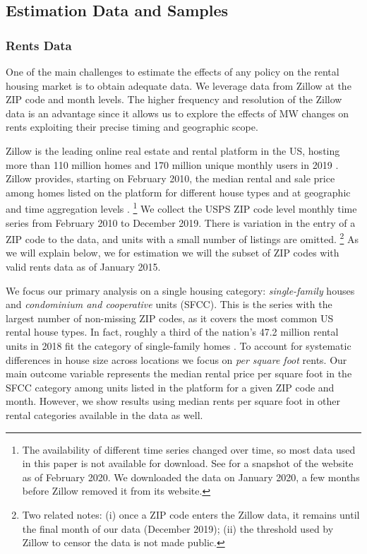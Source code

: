 \subsection{Estimation Data and Samples}

\subsubsection{Rents Data}

One of the main challenges to estimate the effects of any policy on the rental
housing market is to obtain adequate data.
We leverage data from Zillow at the ZIP code and month levels.
The higher frequency and resolution of the Zillow data is an advantage since it 
allows us to explore the effects of MW changes on rents exploiting their precise
timing and geographic scope. 

Zillow is the leading online real estate and rental platform in the US, hosting
more than 110 million homes and 170 million unique monthly users in 2019 
\parencite{ZillowFacts}.
Zillow provides, starting on February 2010, the median rental and sale price among 
homes listed on the platform for different house types and at geographic and 
time aggregation levels \parencite{ZillowData}.%
\footnote{The availability of different time series changed over time, so most
data used in this paper is not available for download.
See \textcite{ZillowDataArchive} for a snapshot of the website as of 
February 2020.
We downloaded the data on January 2020, a few months before Zillow removed it 
from its website.} 
We collect the USPS ZIP code level monthly time series from February 2010 to 
December 2019. 
There is variation in the entry of a ZIP code to the data, and units with a small 
number of listings are omitted.%
\footnote{Two related notes:
(i) once a ZIP code enters the Zillow data, it remains until the final month 
of our data (December 2019);
(ii) the threshold used by Zillow to censor the data is not made public.}
As we will explain below, we for estimation we will the subset of ZIP codes
with valid rents data as of January 2015.

We focus our primary analysis on a single housing category:
\textit{single-family} houses and \textit{condominium and cooperative} units (SFCC).
This is the series with the largest number of non-missing ZIP codes, as it 
covers the most common US rental house types.
In fact, roughly a third of the nation's 47.2 million rental units in 2018 fit 
the category of single-family homes \parencite{Fernald2020}.
To account for systematic differences in house size across locations we focus 
on \textit{per square foot} rents.
Our main outcome variable represents the median rental price per square foot in 
the SFCC category among units listed in the platform for a given ZIP code and 
month.
However, we show results using median rents per square foot in other rental 
categories available in the data as well.

